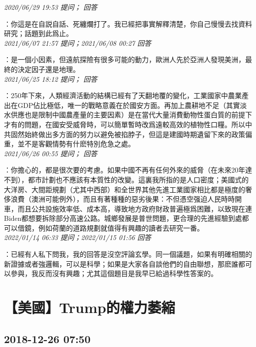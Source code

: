 \documentclass[twocolumn]{ctexart}
\begin{document}
\textit{\hfill\noindent\small 2020/06/29 19:53 提问； 回答}

：你這是在自説自話、死纏爛打了。我已經把事實解釋清楚，你自己慢慢去找資料研究；話題到此爲止。\\

\textit{\hfill\noindent\small 2021/06/07 21:57 提问；2021/06/08 00:27 回答}

：是一個小因素，但遠航探險有很多可能的動力，歐洲人先於亞洲人發現美洲，最終的決定因子還是地理。
\\

\textit{\hfill\noindent\small 2021/06/25 18:12 提问； 回答}

：250年下來，人類經濟活動的結構已經有了天翻地覆的變化，工業國家中農業產出在GDP佔比極低，唯一的戰略意義在於國安方面。再加上農耕地不足（其實淡水供應也是限制中國農產量的主要因素）是在當代大量消費動物性蛋白質的前提下才有的問題，在國安受威脅時，可以簡單暫時改爲遠較高效的植物性口糧。所以中共固然始終做出多方面的努力以避免被掐脖子，但這是建國時期遺留下來的政策偏重，並不是客觀情勢有什麽特別危急之處。\\

\textit{\hfill\noindent\small 2021/06/26 00:55 提问； 回答}

：你擔心的，都是很次要的考慮。如果中國不再有任何外來的威脅（在未來20年達不到），都市計劃也不應該有本質性的改變。這裏我所指的是人口密度；美國式的大洋房、大間距規劃（尤其中西部）和全世界其他先進工業國家相比都是極度的奢侈浪費（澳洲可能例外），而且有著種種的惡劣後果：不但憑空强迫人民時時開車，而且公共設施效率低、成本高，導致地方政府財政普遍極爲困難，以致現在連Biden都想要拆除部分高速公路。城鄉發展是普世問題，更合理的先進經驗到處都可以借鏡，例如荷蘭的道路規劃就值得有興趣的讀者去研究一番。\\

\textit{\hfill\noindent\small 2022/01/14 06:33 提问；2022/01/15 01:56 回答}

：已經有人私下問我，我的回答是沒空評論玄學。同一個議題，如果有明確相關的新證據或者強邏輯，可以是科學；如果是大家各自談他們的自由聯想，那麽誰都可以參與，我反而沒有興趣；尤其這個題目是我早已給過科學性答案的。
\\


\section{【美國】Trump的權力萎縮}
\subsection{2018-12-26 07:50}
\end{document}
